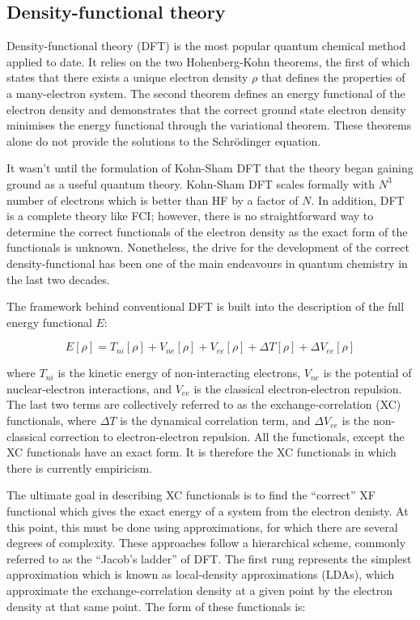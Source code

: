 \subsection{Density-functional theory}

Density-functional theory (DFT) is the most popular quantum chemical method applied to date. It relies on the two Hohenberg-Kohn theorems, the first of which states that there exists a unique electron density $\rho$ that defines the properties of a many-electron system. The second theorem defines an energy functional of the electron density and demonstrates that the correct ground state electron density minimises the energy functional through the variational theorem.\cite{Hohenberg1964,Koch2000} These theorems alone do not provide the solutions to the Schr{\"o}dinger equation.

It wasn't until the formulation of Kohn-Sham DFT\cite{Kohn1965} that the theory began gaining ground as a useful quantum theory. Kohn-Sham DFT scales formally with $N^3$ number of electrons\cite{Cramer2004} which is better than HF by a factor of $N$. In addition, DFT is a complete theory like FCI; however, there is no straightforward way to determine the correct functionals of the electron density as the exact form of the functionals is unknown. Nonetheless, the drive for the development of the correct density-functional has been one of the main endeavours in quantum chemistry in the last two decades.

The framework behind conventional DFT is built into the description of the full energy functional $E$:

\begin{equation}
  E[\rho] = T_{ni}[\rho] + V_{ne}[\rho] + V_{ee}[\rho] + \Delta T[\rho] + \Delta V_{ee}[\rho]
\label{eq:DFT}
\end{equation}

\noindent where $T_{ni}$ is the kinetic energy of non-interacting electrons, $V_{ne}$ is the potential of nuclear-electron interactions, and $V_{ee}$ is the classical electron-electron repulsion. The last two terms are collectively referred to as the exchange-correlation (XC) functionals, where $\Delta T$ is the dynamical correlation term, and $\Delta V_{ee}$ is the non-classical correction to electron-electron repulsion. All the functionals, except the XC functionals have an exact form. It is therefore the XC functionals in which there is currently empiricism.

The ultimate goal in describing XC functionals is to find the ``correct'' XF functional which gives the exact energy of a system from the electron denisty. At this point, this must be done using approximations, for which there are several degrees of complexity. These approaches follow a hierarchical scheme, commonly referred to as the ``Jacob's ladder'' of DFT.\cite{Perdew2005} The first rung represents the simplest approximation which is known as local-density approximations (LDAs), which approximate the exchange-correlation density at a given point by the electron density at that same point. The form of these functionals is:

